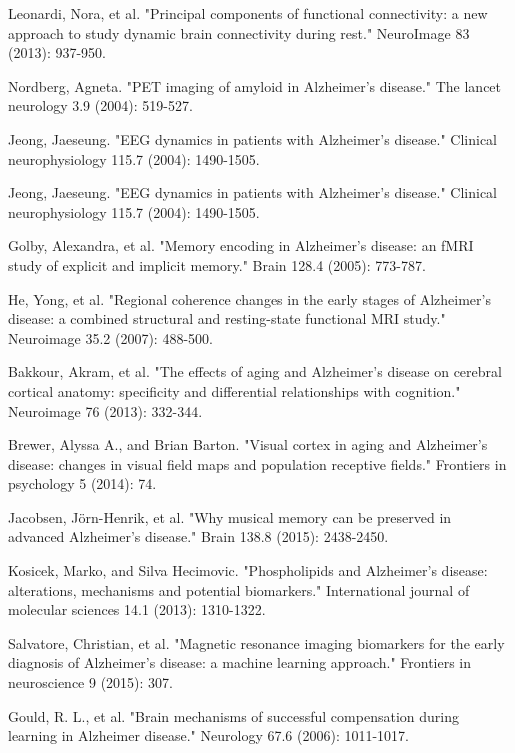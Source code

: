 \documentclass[journal]{IEEEtran}
\begin{document}
{\begin{thebibliography}{1}
		Leonardi, Nora, et al. "Principal components of functional connectivity: a new approach to study dynamic brain connectivity during rest." NeuroImage 83 (2013): 937-950.
		
		Nordberg, Agneta. "PET imaging of amyloid in Alzheimer's disease." The lancet neurology 3.9 (2004): 519-527.
		
		Jeong, Jaeseung. "EEG dynamics in patients with Alzheimer's disease." Clinical neurophysiology 115.7 (2004): 1490-1505.
		
		Jeong, Jaeseung. "EEG dynamics in patients with Alzheimer's disease." Clinical neurophysiology 115.7 (2004): 1490-1505.
		
		Golby, Alexandra, et al. "Memory encoding in Alzheimer's disease: an fMRI study of explicit and implicit memory." Brain 128.4 (2005): 773-787.
		
		He, Yong, et al. "Regional coherence changes in the early stages of Alzheimer’s disease: a combined structural and resting-state functional MRI study." Neuroimage 35.2 (2007): 488-500.
		
		
		
		Bakkour, Akram, et al. "The effects of aging and Alzheimer's disease on cerebral cortical anatomy: specificity and differential relationships with cognition." Neuroimage 76 (2013): 332-344.
		
		Brewer, Alyssa A., and Brian Barton. "Visual cortex in aging and Alzheimer's disease: changes in visual field maps and population receptive fields." Frontiers in psychology 5 (2014): 74.
		
		Jacobsen, Jörn-Henrik, et al. "Why musical memory can be preserved in advanced Alzheimer’s disease." Brain 138.8 (2015): 2438-2450.
		
		Kosicek, Marko, and Silva Hecimovic. "Phospholipids and Alzheimer’s disease: alterations, mechanisms and potential biomarkers." International journal of molecular sciences 14.1 (2013): 1310-1322.
		
		Salvatore, Christian, et al. "Magnetic resonance imaging biomarkers for the early diagnosis of Alzheimer's disease: a machine learning approach." Frontiers in neuroscience 9 (2015): 307.
		
		Gould, R. L., et al. "Brain mechanisms of successful compensation during learning in Alzheimer disease." Neurology 67.6 (2006): 1011-1017.
		

\end{thebibliography}}
\end{document}
